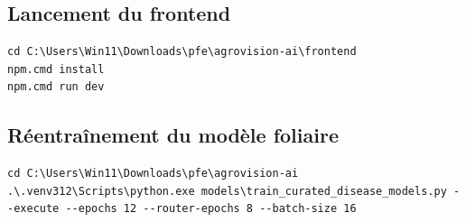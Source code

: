\documentclass[12pt,a4paper]{report}
\begin{document}
\subsection*{Lancement du frontend}

\begin{verbatim}
cd C:\Users\Win11\Downloads\pfe\agrovision-ai\frontend
npm.cmd install
npm.cmd run dev
\end{verbatim}

\subsection*{Réentraînement du modèle foliaire}

\begin{verbatim}
cd C:\Users\Win11\Downloads\pfe\agrovision-ai
.\.venv312\Scripts\python.exe models\train_curated_disease_models.py --execute --epochs 12 --router-epochs 8 --batch-size 16
\end{verbatim}
\end{document}
